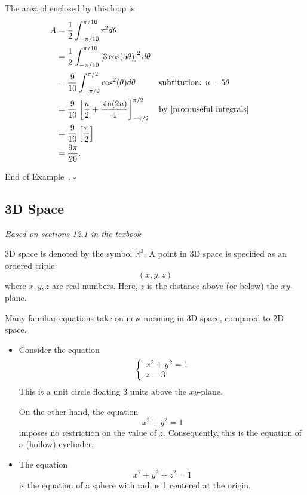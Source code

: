 \documentclass[10pt]{article}
\theoremstyle{definition}
\newtheorem{example}[theorem]{Example}
\renewenvironment{example}
{\begin{oldexample}}
  {\par\smallskip\hfill   End of Example~\theexample. $\square$    \par\end{oldexample}}
\newcommand{\1}[1]{\textbf{1}_{\left[#1\right]}} %
\def\R{\mathbb{R}} %
\begin{document}
\begin{example}
\begin{center}
  \end{center}
  The area of enclosed by this loop is
  \begin{align*}
    A 
    &= \frac{1}{2}\int_{-\pi/10}^{\pi/10} r^{2}d\theta\\
    &= \frac{1}{2}\int_{-\pi/10}^{\pi/10} \left[ 3\cos(5\theta) \right]^{2}  d\theta\\
    &= \frac{9}{10}\int_{-\pi/2}^{\pi/2} \cos^{2}(\theta)d\theta &&\text{subtitution: $u=5\theta$ }\\
    &= \frac{9}{10} \left[ \frac{u}{2}+\frac{\sin(2u)}{4} \right]^{\pi/2}_{-\pi/2} &&\text{by \cref{prop:useful-integrals} } \\
    &= \frac{9}{10} \left[ \frac{\pi}{2}    \right]\\
    &= \frac{9\pi}{20}.
  \end{align*}
\end{example}




\subsection{3D Space}
\textit{Based on sections 12.1 in the texbook}

3D space is denoted by the symbol $\R^{3}$. A point in 3D space is specified as an ordered triple
\begin{equation*}
  \left( x,y,z \right) 
\end{equation*}
where $x,y,z$ are real numbers. Here, $z$ is the distance above (or below) the $xy$-plane.


Many familiar equations take on new meaning in 3D space, compared to 2D space.

\begin{itemize}
  \item Consider the equation
  \begin{equation*}
    \left\{ \begin{array}{l@{}l} x^{2}+y^{2} =1 \\ z=3 \end{array}\right.
  \end{equation*}
  This is a unit circle floating 3 units above the $xy$-plane.

  On the other hand, the equation
  \begin{equation*}
    x^{2}+y^{2}=1
  \end{equation*}
  imposes no restriction on the value of $z$. Consequently, this is the equation of a (hollow) cyclinder.

  \item The equation
  \begin{equation*}
    x^{2}+y^{2}+z^{2}=1
  \end{equation*}
  is the equation of a sphere with radius 1 centered at the origin.

\end{itemize}
\end{document}
